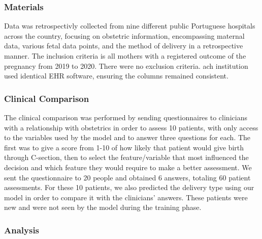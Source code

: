 
\subsubsection{Materials}
Data was retrospectivly collected from nine different public Portuguese hospitals across the country, focusing on obstetric information, encompassing maternal data, various fetal data points, and the method of delivery in a retrospective manner. The inclusion criteria is all mothers with a registered outcome of the pregnancy from 2019 to 2020. There were no exclusion criteria. ach institution used identical EHR software, ensuring the columns remained consistent. 

\subsubsection{Clinical Comparison}
The clinical comparison was performed by sending questionnaires to clinicians with a relationship with obstetrics in order to assess 10 patients, with only access to the variables used by the model and to answer three questions for each. The first was to give a score from 1-10 of how likely that patient would give birth through C-section, then to select the feature/variable that most influenced the decision and which feature they would require to make a better assessment. We sent the questionnaire to 20 people and obtained 6 answers, totaling 60 patient assessments. For these 10 patients, we also predicted the delivery type using our model in order to compare it with the clinicians' answers. These patients were new and were not seen by the model during the training phase.

\subsubsection{Analysis}

